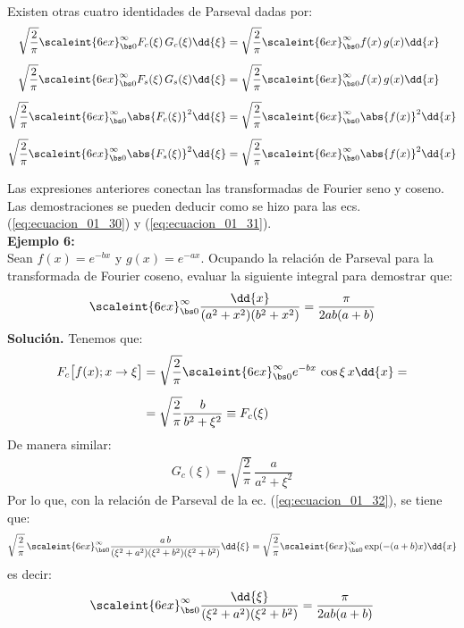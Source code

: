 \\[0.5em]
Existen otras cuatro identidades de Parseval dadas por:
\begin{align}
\sqrt{\dfrac{2}{\pi}} \scaleint{6ex}_{\bs 0}^{\infty} F_{c} (\xi) \, G_{c} (\xi) \dd{\xi} &= \sqrt{\dfrac{2}{\pi}} \scaleint{6ex}_{\bs 0}^{\infty} f (x) \, g(x) \dd{x} \label{eq:ecuacion_01_32} \\[0.5em]
\sqrt{\dfrac{2}{\pi}} \scaleint{6ex}_{\bs 0}^{\infty} F_{s} (\xi) \, G_{s} (\xi) \dd{\xi} &= \sqrt{\dfrac{2}{\pi}} \scaleint{6ex}_{\bs 0}^{\infty} f (x) \, g(x) \dd{x} \label{eq:ecuacion_01_33} \\[0.5em]
\sqrt{\dfrac{2}{\pi}} \scaleint{6ex}_{\bs 0}^{\infty} \abs{F_{c} (\xi)}^{2} \dd{\xi} &= \sqrt{\dfrac{2}{\pi}} \scaleint{6ex}_{\bs 0}^{\infty} \abs{f (x)}^{2} \dd{x} \label{eq:ecuacion_01_34} \\[0.5em]
\sqrt{\dfrac{2}{\pi}} \scaleint{6ex}_{\bs 0}^{\infty} \abs{F_{s} (\xi)}^{2} \dd{\xi} &= \sqrt{\dfrac{2}{\pi}} \scaleint{6ex}_{\bs 0}^{\infty} \abs{f (x)}^{2} \dd{x} \label{eq:ecuacion_01_35}
\end{align}

Las expresiones anteriores conectan las transformadas de Fourier seno y coseno. Las demostraciones se pueden deducir como se hizo para las ecs. (\ref{eq:ecuacion_01_30}) y (\ref{eq:ecuacion_01_31}).
\\
\noindent
\textbf{Ejemplo 6:}
\\
Sean $f (x) = e^{-bx}$ y $g(x) = e^{-ax}$. Ocupando la relación de Parseval para la transformada de Fourier coseno, evaluar la siguiente integral para demostrar que:
\begin{align*}
\scaleint{6ex}_{\bs 0}^{\infty} \dfrac{\dd{x}}{(a^{2} + x^{2})(b^{2} + x^{2})} = \dfrac{\pi}{2 a b (a + b)}
\end{align*}
\textbf{Solución.} Tenemos que:
\begin{align*}
F_{c} \big[ f (x); x \to \xi \big] &= \sqrt{\dfrac{2}{\pi}} \scaleint{6ex}_{\bs 0}^{\infty} e^{-b x} \, \cos \xi \, x \dd{x} = \\[0.5em]
&= \sqrt{\dfrac{2}{\pi}} \dfrac{b}{b^{2} + \xi^{2}} \equiv F_{c} (\xi)
\end{align*}
De manera similar:
\begin{align*}
G_{c} (\xi) = \sqrt{\dfrac{2}{\pi}} \, \dfrac{a}{a^{2} + \xi^{2}}
\end{align*}
Por lo que, con la relación de Parseval de la ec. (\ref{eq:ecuacion_01_32}), se tiene que:
\begin{align*}
\sqrt{\dfrac{2}{\pi}} \, \scaleint{6ex}_{\bs 0}^{\infty} \dfrac{a \, b}{(\xi^{2} + a^{2})(\xi^{2} + b^{2})(\xi^{2} + b^{2})} \dd{\xi} = \sqrt{\dfrac{2}{\pi}} \scaleint{6ex}_{\bs 0}^{\infty} \exp(-(a + b) x) \dd{x}
\end{align*}
es decir:
\begin{align*}
\scaleint{6ex}_{\bs 0}^{\infty} \dfrac{\dd{\xi}}{(\xi^{2} + a^{2})(\xi^{2} + b^{2})} = \dfrac{\pi}{2 a b (a + b)}
\end{align*}

